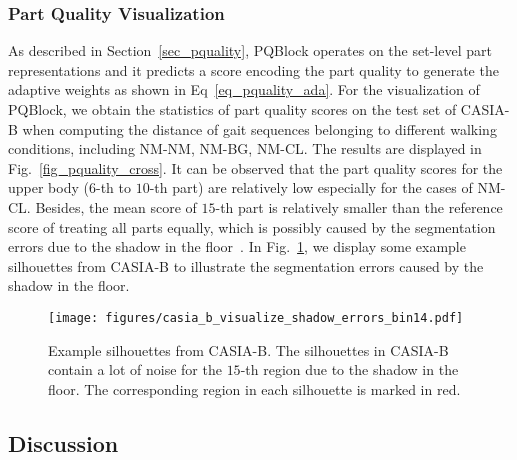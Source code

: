 \subsubsection{Part Quality Visualization}
As described in Section~\ref{sec_pquality}, PQBlock operates on the set-level part representations and it predicts a score encoding the part quality to generate the adaptive weights as shown in Eq~\eqref{eq_pquality_ada}.
%
For the visualization of PQBlock, we obtain the statistics of part quality scores on the test set of CASIA-B when computing the distance of gait sequences belonging to different walking conditions, including NM-NM, NM-BG, NM-CL.
%
The results are displayed in Fig.~\ref{fig_pquality_cross}.
%
It can be observed that the part quality scores for the upper body ($6$-th to $10$-th part) are relatively low especially for the cases of NM-CL.
%
%
Besides, the mean score of $15$-th part is relatively smaller than the reference score of treating all parts equally, which is possibly caused by the segmentation errors due to the shadow in the floor~\cite{yu2006framework}.
%
In Fig.~\ref{fig_shadow_errors}, we display some example silhouettes from CASIA-B to illustrate the segmentation errors caused by the shadow in the floor.

\begin{figure}[t]
	\centering
	\texttt{[image: figures/casia\_b\_visualize\_shadow\_errors\_bin14.pdf]}
	\caption{
		Example silhouettes from CASIA-B.
		The silhouettes in CASIA-B contain a lot of noise for the $15$-th region due to the shadow in the floor.
		The corresponding region in each silhouette is marked in red.
	}
	\label{fig_shadow_errors}
\end{figure}

\subsection{Discussion}
\label{sec_discussion}
